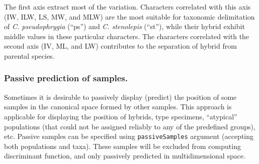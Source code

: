 \documentclass[
]{article}
\newenvironment{Shaded}{\begin{snugshade}}{\end{snugshade}}
\newcommand{\CommentTok}[1]{\textcolor[rgb]{0.56,0.35,0.01}{\textit{#1}}}
\newcommand{\NormalTok}[1]{#1}
\newcommand{\OperatorTok}[1]{\textcolor[rgb]{0.81,0.36,0.00}{\textbf{#1}}}
\begin{document}
\begin{Shaded}
\end{Shaded}

The first axis extract most of the variation. Characters correlated with
this axis (IW, ILW, LS, MW, and MLW) are the most suitable for taxonomic
delimitation of \emph{C. pseudophrygia} (``ps'') and \emph{C.
stenolepis} (``st''), while their hybrid exhibit middle values in these
particular characters. The characters correlated with the second axis
(IV, ML, and LW) contributes to the separation of hybrid from parental
species.

\hypertarget{passive-prediction-of-samples.}{%
\subsubsection{Passive prediction of
samples.}\label{passive-prediction-of-samples.}}

Sometimes it is desirable to passively display (predict) the position of
some samples in the canonical space formed by other samples. This
approach is applicable for displaying the position of hybrids, type
specimens, ``atypical'' populations (that could not be assigned reliably
to any of the predefined groups), etc. Passive samples can be specified
using \texttt{passiveSamples} argument (accepting both populations and
taxa). These samples will be excluded from computing discriminant
function, and only passively predicted in multidimensional space.
\end{document}
